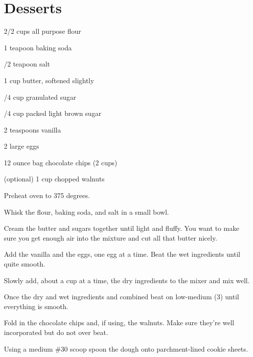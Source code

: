 \chapter{Desserts}


%
%
%
%
\newpage



\begin{IngredientsAndSteps}
    \ListIngredientsAndSteps
    {
        2/2 cups all purpose flour

        1 teapoon baking soda

        /2 teapoon salt

        \IngredientsSeparatorClear

        1 cup butter, softened slightly

        /4 cup granulated sugar

        /4 cup packed light brown sugar

        \IngredientsSeparatorClear

        2 teaspoons vanilla

        2 large eggs

        12 ounce bag chocolate chips (2 cups)

        (optional) 1 cup chopped walnuts
    }
    {
        Preheat oven to 375 degrees.

        Whisk the flour, baking soda, and salt in a small bowl.

        Cream the butter and sugars together until light and fluffy. You want to make sure you get
        enough air into the mixture and cut all that butter nicely.

        Add the vanilla and the eggs, one egg at a time. Beat the wet ingredients until quite smooth.

        Slowly add, about a cup at a time, the dry ingredients to the mixer and mix well.

        Once the dry and wet ingredients and combined beat on low-medium (3) until
        everything is smooth.

        Fold in the chocolate chips and, if using, the walnuts. Make sure they're well
        incorporated but do not over beat.

        Using a medium \#30 scoop spoon the dough onto parchment-lined cookie sheets.
    }
\end{IngredientsAndSteps}

